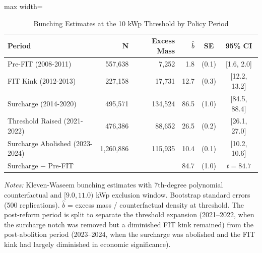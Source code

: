 \begin{table}[t]
\centering
\caption{Bunching Estimates at the 10 kWp Threshold by Policy Period}
\label{tab:bunching}
\begin{adjustbox}{max width=\textwidth}
\begin{tabular}{lrrrcc}
\toprule
Period & N & Excess Mass & $\hat{b}$ & SE & 95\% CI \\
\midrule
Pre-FIT (2008-2011) & 557,638 & 7,252 & 1.8 & (0.1) & [1.6, 2.0] \\
FIT Kink (2012-2013) & 227,158 & 17,731 & 12.7 & (0.3) & [12.2, 13.2] \\
Surcharge (2014-2020) & 495,571 & 134,524 & 86.5 & (1.0) & [84.5, 88.4] \\
Threshold Raised (2021-2022) & 476,386 & 88,652 & 26.5 & (0.2) & [26.1, 27.0] \\
Surcharge Abolished (2023-2024) & 1,260,886 & 115,935 & 10.4 & (0.1) & [10.2, 10.6] \\
\midrule
Surcharge $-$ Pre-FIT & & & 84.7 & (1.0) & $t = 84.7$ \\
\bottomrule
\end{tabular}
\end{adjustbox}

\begin{flushleft}\small \textit{Notes:} Kleven-Waseem bunching estimates with 7th-degree polynomial counterfactual and $[9.0, 11.0)$ kWp exclusion window. Bootstrap standard errors (500 replications). $\hat{b}$ = excess mass / counterfactual density at threshold. The post-reform period is split to separate the threshold expansion (2021--2022, when the surcharge notch was removed but a diminished FIT kink remained) from the post-abolition period (2023--2024, when the surcharge was abolished and the FIT kink had largely diminished in economic significance).\end{flushleft}
\end{table}


